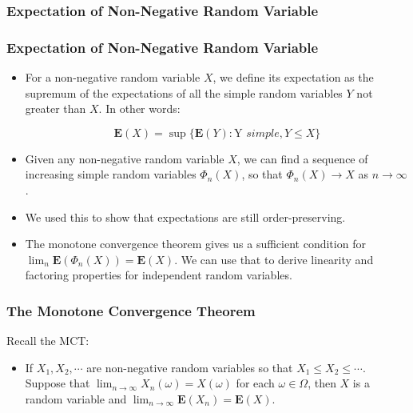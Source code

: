 \documentclass[handout]{beamer}
\newcommand{\BE}{\mathbf{E}}
\begin{document}
\subsubsection{Expectation of Non-Negative Random Variable}


\frame
{
  \frametitle{Expectation of Non-Negative Random Variable}

   \begin{itemize}


\item<1-> For a non-negative random variable $X$, we define its expectation as the supremum of the expectations of all the simple random variables $Y$ not greater than $X$. In other words:
                         
                         $$\BE(X)=\sup\{\BE(Y): \text{Y } simple, Y\leq X\}$$
                         
\item<1-> Given any non-negative random variable $X$, we can find a sequence of increasing simple random variables $\Phi_n(X)$, so that $\Phi_n(X)\rightarrow X$ as $n\rightarrow \infty$.
         
\item<1-> We used this to show that expectations are still order-preserving. 

\item<1-> The monotone convergence theorem gives us a sufficient condition for $\lim_{n}\BE(\Phi_n(X))=\BE(X)$. We can use that to derive linearity and factoring properties for independent random variables.  

                                                                                                                              \end{itemize}
}


\frame
{
\frametitle{The Monotone Convergence Theorem}

Recall the MCT: 

\begin{itemize}

\item<2->[]\begin{Theorem} If $X_1, X_2, \cdots$ are non-negative random variables so that $X_1\leq X_2\leq \cdots $. Suppose that $\lim_{n\rightarrow \infty} X_n(\omega)=X(\omega)$ for each $\omega \in \Omega$, then $X$ is a random variable and $\lim_{n\rightarrow \infty} \BE(X_n)=\BE(X)$. 
                          
\end{Theorem}                           
                                                                                                          

\end{itemize}
}
\end{document}
